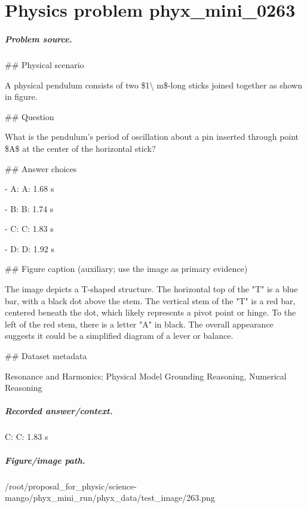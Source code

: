 
\chapter{Physics problem phyx\_mini\_0263}
\label{ch:PhyXMiniProblems_problem_phyx_mini_0263}

\paragraph{Problem source.}
\#\# Physical scenario

A physical pendulum consists of two \$1\textbackslash{} m\$-long sticks joined together as shown in figure.

\#\# Question

What is the pendulum's period of oscillation about a pin inserted through point \$A\$ at the center of the horizontal stick?

\#\# Answer choices

- A: A: 1.68 s

- B: B: 1.74 s

- C: C: 1.83 s

- D: D: 1.92 s

\#\# Figure caption (auxiliary; use the image as primary evidence)

The image depicts a T-shaped structure. The horizontal top of the "T" is a blue bar, with a black dot above the stem. The vertical stem of the "T" is a red bar, centered beneath the dot, which likely represents a pivot point or hinge. To the left of the red stem, there is a letter "A" in black. The overall appearance suggests it could be a simplified diagram of a lever or balance.

\#\# Dataset metadata

Resonance and Harmonics; Physical Model Grounding Reasoning, Numerical Reasoning

\paragraph{Recorded answer/context.}
C: C: 1.83 s

\paragraph{Figure/image path.}
/root/proposal\_for\_physic/science-mango/phyx\_mini\_run/phyx\_data/test\_image/263.png


